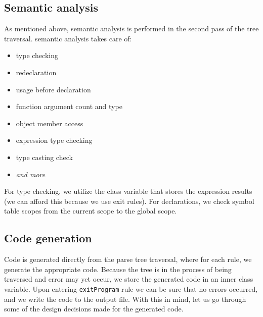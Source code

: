 \documentclass[a4paper,11pt]{article}
\begin{document}
       \subsection{Semantic analysis}
            As mentioned above, semantic analysis is performed in the second pass of the tree traversal.
            semantic analysis takes care of:
            \begin{itemize}
                \item type checking
                \item redeclaration
                \item usage before declaration
                \item function argument count and type
                \item object member access
                \item expression type checking
                \item type casting check
                \item \textit{and more}
            \end{itemize}

            For type checking, we utilize the class variable that stores the expression results (we can afford this because we use exit rules).
            For declarations, we check symbol table scopes from the current scope to the global scope.

		\subsection {Code generation}
	            Code is generated directly from the parse tree traversal, where for each rule, we generate the appropriate code.
                Because the tree is in the process of being traversed and error may yet occur, we store the generated code in an inner class variable.
                Upon entering \texttt{exitProgram} rule we can be sure that no errors occurred, and we write the code to the output file.
                With this in mind, let us go through some of the design decisions made for the generated code.
\end{document}
